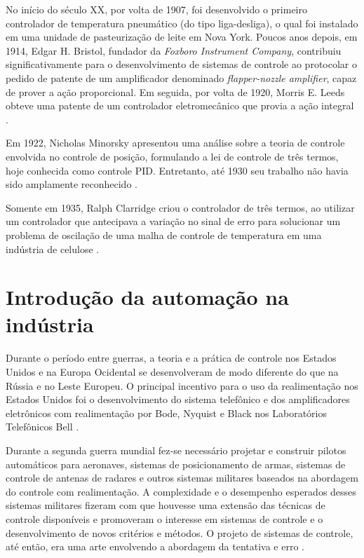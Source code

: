 No início do século XX, por volta de 1907, foi desenvolvido o primeiro
controlador de temperatura pneumático (do tipo liga-desliga), o qual foi
instalado em uma unidade de pasteurização de leite em Nova York. Poucos anos
depois, em 1914, Edgar H. Bristol, fundador da {\it Foxboro Instrument Company},
contribuiu significativamente para o desenvolvimento de sistemas de controle ao
protocolar o pedido de patente de um amplificador denominado {\it flapper-nozzle
amplifier}, capaz de prover a ação proporcional. Em seguida, por volta de 1920,
Morris E. Leeds obteve uma patente de um controlador eletromecânico que provia a
ação integral \cite{faccin:2004}.

Em 1922, Nicholas Minorsky apresentou uma análise sobre a teoria de controle
envolvida no controle de posição, formulando a lei de controle de três termos,
hoje conhecida como controle PID.  Entretanto, até 1930 seu trabalho não havia
sido amplamente reconhecido \cite{bennett:1996}.

Somente em 1935, Ralph Clarridge criou o controlador de três termos, ao utilizar
um controlador que antecipava a variação no sinal de erro para solucionar um
problema de oscilação de uma malha de controle de temperatura em uma indústria
de celulose \cite{faccin:2004}.

\section{Introdução da automação na indústria}
Durante o período entre guerras, a teoria e a prática de controle nos Estados
Unidos e na Europa Ocidental se desenvolveram de modo diferente do que na Rússia
e no Leste Europeu. O principal incentivo para o uso da realimentação nos
Estados Unidos foi o desenvolvimento do sistema telefônico e dos amplificadores
eletrônicos com realimentação por Bode, Nyquist e Black nos Laboratórios
Telefônicos Bell \cite{dorf:2009}.

Durante a segunda guerra mundial fez-se necessário projetar e construir pilotos
automáticos para aeronaves, sistemas de posicionamento de armas, sistemas de
controle de antenas de radares e outros sistemas militares baseados na abordagem
do controle com realimentação. A complexidade e o desempenho esperados desses
sistemas militares fizeram com que houvesse uma extensão das técnicas de
controle disponíveis e promoveram o interesse em sistemas de controle e o
desenvolvimento de novos critérios e métodos. O projeto de sistemas de controle,
até então, era uma arte envolvendo a abordagem da tentativa e erro
\cite{dorf:2009}.

